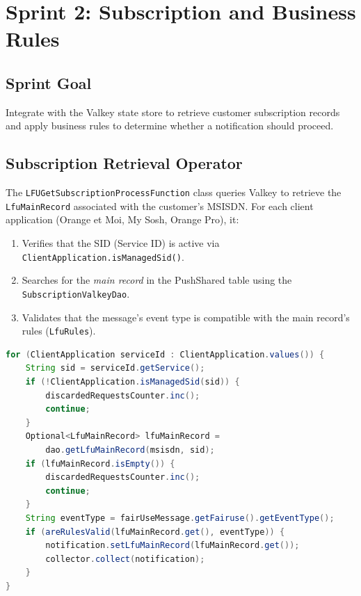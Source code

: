 \section{Sprint 2: Subscription and Business Rules}
\label{sec:sprint2}

\subsection{Sprint Goal}

Integrate with the Valkey state store to retrieve customer subscription records and apply business rules to determine whether a notification should proceed.

\subsection{Subscription Retrieval Operator}

The \texttt{LFUGetSubscriptionProcessFunction} class queries Valkey to retrieve the \texttt{LfuMainRecord} associated with the customer's MSISDN. For each client application (Orange et Moi, My Sosh, Orange Pro), it:
\begin{enumerate}
    \item Verifies that the SID (Service ID) is active via \texttt{ClientApplication.isManagedSid()}.
    \item Searches for the \textit{main record} in the PushShared table using the \texttt{SubscriptionValkeyDao}.
    \item Validates that the message's event type is compatible with the main record's rules (\texttt{LfuRules}).
\end{enumerate}

\begin{lstlisting}[language=Java, caption={Main record retrieval from Valkey}]
for (ClientApplication serviceId : ClientApplication.values()) {
    String sid = serviceId.getService();
    if (!ClientApplication.isManagedSid(sid)) {
        discardedRequestsCounter.inc();
        continue;
    }
    Optional<LfuMainRecord> lfuMainRecord =
        dao.getLfuMainRecord(msisdn, sid);
    if (lfuMainRecord.isEmpty()) {
        discardedRequestsCounter.inc();
        continue;
    }
    String eventType = fairUseMessage.getFairuse().getEventType();
    if (areRulesValid(lfuMainRecord.get(), eventType)) {
        notification.setLfuMainRecord(lfuMainRecord.get());
        collector.collect(notification);
    }
}
\end{lstlisting}

